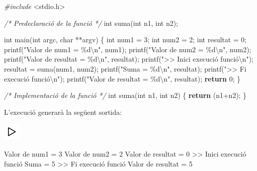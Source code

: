 \documentclass[]{book}
\newenvironment{Shaded}{\begin{snugshade}}{\end{snugshade}}
\newcommand{\CommentTok}[1]{\textcolor[rgb]{0.56,0.35,0.01}{\textit{#1}}}
\newcommand{\ControlFlowTok}[1]{\textcolor[rgb]{0.13,0.29,0.53}{\textbf{#1}}}
\newcommand{\DataTypeTok}[1]{\textcolor[rgb]{0.13,0.29,0.53}{#1}}
\newcommand{\DecValTok}[1]{\textcolor[rgb]{0.00,0.00,0.81}{#1}}
\newcommand{\ImportTok}[1]{#1}
\newcommand{\NormalTok}[1]{#1}
\newcommand{\PreprocessorTok}[1]{\textcolor[rgb]{0.56,0.35,0.01}{\textit{#1}}}
\newcommand{\SpecialCharTok}[1]{\textcolor[rgb]{0.00,0.00,0.00}{#1}}
\newcommand{\StringTok}[1]{\textcolor[rgb]{0.31,0.60,0.02}{#1}}
\begin{document}
\begin{Shaded}
\begin{Highlighting}[]
\PreprocessorTok{\#include }\ImportTok{\textless{}stdio.h\textgreater{}}

\CommentTok{/* Predeclaració de la funció */}
\DataTypeTok{int}\NormalTok{ suma(}\DataTypeTok{int}\NormalTok{ n1, }\DataTypeTok{int}\NormalTok{ n2);}

\DataTypeTok{int}\NormalTok{ main(}\DataTypeTok{int}\NormalTok{ argc, }\DataTypeTok{char}\NormalTok{ **argv) \{}
    \DataTypeTok{int}\NormalTok{ num1 = }\DecValTok{3}\NormalTok{;}
    \DataTypeTok{int}\NormalTok{ num2 = }\DecValTok{2}\NormalTok{;}
    \DataTypeTok{int}\NormalTok{ resultat = }\DecValTok{0}\NormalTok{;}
\NormalTok{    printf(}\StringTok{"Valor de num1 = \%d}\SpecialCharTok{\textbackslash{}n}\StringTok{"}\NormalTok{, num1);}
\NormalTok{    printf(}\StringTok{"Valor de num2 = \%d}\SpecialCharTok{\textbackslash{}n}\StringTok{"}\NormalTok{, num2);}
\NormalTok{    printf(}\StringTok{"Valor de resultat = \%d}\SpecialCharTok{\textbackslash{}n}\StringTok{"}\NormalTok{, resultat);}
\NormalTok{    printf(}\StringTok{"\textgreater{}\textgreater{} Inici execució funció}\SpecialCharTok{\textbackslash{}n}\StringTok{"}\NormalTok{);}
\NormalTok{    resultat = suma(num1, num2);}
\NormalTok{    printf(}\StringTok{"Suma = \%d}\SpecialCharTok{\textbackslash{}n}\StringTok{"}\NormalTok{, resultat);}
\NormalTok{    printf(}\StringTok{"\textgreater{}\textgreater{} Fi execució funció}\SpecialCharTok{\textbackslash{}n}\StringTok{"}\NormalTok{);}
\NormalTok{    printf(}\StringTok{"Valor de resultat = \%d}\SpecialCharTok{\textbackslash{}n}\StringTok{"}\NormalTok{, resultat);}
    \ControlFlowTok{return} \DecValTok{0}\NormalTok{;}
\NormalTok{\}}

\CommentTok{/* Implementació de la funció */}
\DataTypeTok{int}\NormalTok{ suma(}\DataTypeTok{int}\NormalTok{ n1, }\DataTypeTok{int}\NormalTok{ n2) \{}
    \ControlFlowTok{return}\NormalTok{ (n1+n2);}
\NormalTok{\}}
\end{Highlighting}
\end{Shaded}

L'execució generarà la següent sortida:

\includegraphics{./img/play.png}

\begin{Shaded}
\begin{Highlighting}[]
\NormalTok{Valor de num1 = }\DecValTok{3}
\NormalTok{Valor de num2 = }\DecValTok{2}
\NormalTok{Valor de resultat = }\DecValTok{0}
\NormalTok{\textgreater{}\textgreater{} Inici execució funció}
\NormalTok{Suma = }\DecValTok{5}
\NormalTok{\textgreater{}\textgreater{} Fi execució funció}
\NormalTok{Valor de resultat = }\DecValTok{5}
\end{Highlighting}
\end{Shaded}
\end{document}
